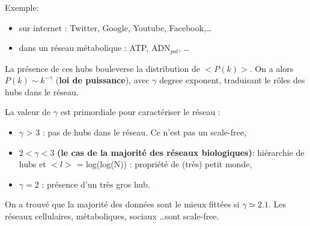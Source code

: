 \medskip
Exemple: 
\begin{itemize}
	\item sur internet : Twitter, Google, Youtube, Facebook,\ldots
	\item dans un réseau métabolique : ATP, ADN$_{pol}$, \ldots
\end{itemize}

\medskip
La présence de ces hubs bouleverse la distribution de $<P(k)>$. On a alors $P(k) \sim k^{-\gamma}$ (\textbf{loi de puissance}), avec $\gamma$ degree exponent, traduisant le rôles des hubs dans le réseau.

\medskip
La valeur de $\gamma$ est primordiale pour caractériser le réseau :
\begin{itemize}
	\item $\gamma$ > 3 : pas de hubs dans le réseau. Ce n'est pas un scale-free,
	\item $2 < \gamma < 3$ \textbf{(le cas de la majorité des réseaux biologiques)}: hiérarchie de hubs et $<l>$ = log(log(N)) : propriété de (très) petit monde,
	\item $\gamma = 2$ : présence d'un très gros hub.\medskip
\end{itemize}

On a trouvé que la majorité des données sont le mieux fittées si $\gamma \simeq 2.1$. Les réseaux cellulaires, métaboliques, sociaux \ldots sont scale-free.

